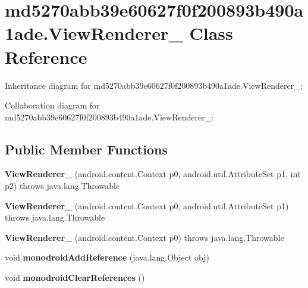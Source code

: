 \hypertarget{classmd5270abb39e60627f0f200893b490a1ade_1_1_view_renderer__2}{}\section{md5270abb39e60627f0f200893b490a1ade.\+View\+Renderer\+\_ Class Reference}
\label{classmd5270abb39e60627f0f200893b490a1ade_1_1_view_renderer__2}


Inheritance diagram for md5270abb39e60627f0f200893b490a1ade.\+View\+Renderer\+\_\+:


Collaboration diagram for md5270abb39e60627f0f200893b490a1ade.\+View\+Renderer\+\_\+:
\subsection*{Public Member Functions}
\begin{DoxyCompactItemize}
\item 
\mbox{\label{classmd5270abb39e60627f0f200893b490a1ade_1_1_view_renderer__2_a34f641fdb772410dc88ca2ac5c3fb492}} 
{\bfseries View\+Renderer\+\_} (android.\+content.\+Context p0, android.\+util.\+Attribute\+Set p1, int p2)  throws java.\+lang.\+Throwable 	
\item 
\mbox{\label{classmd5270abb39e60627f0f200893b490a1ade_1_1_view_renderer__2_a0295102267caddfc524759e82d0f5b04}} 
{\bfseries View\+Renderer\+\_} (android.\+content.\+Context p0, android.\+util.\+Attribute\+Set p1)  throws java.\+lang.\+Throwable 	
\item 
\mbox{\label{classmd5270abb39e60627f0f200893b490a1ade_1_1_view_renderer__2_a7f4b9d7dd89bbae2b8dd2f6c799e4c02}} 
{\bfseries View\+Renderer\+\_} (android.\+content.\+Context p0)  throws java.\+lang.\+Throwable 	
\item 
\mbox{\label{classmd5270abb39e60627f0f200893b490a1ade_1_1_view_renderer__2_a04a86dd6eb699648d23fe42d567c6962}} 
void {\bfseries monodroid\+Add\+Reference} (java.\+lang.\+Object obj)
\item 
\mbox{\label{classmd5270abb39e60627f0f200893b490a1ade_1_1_view_renderer__2_a4832372c2c5755cd4e9f279f9b051454}} 
void {\bfseries monodroid\+Clear\+References} ()
\end{DoxyCompactItemize}
